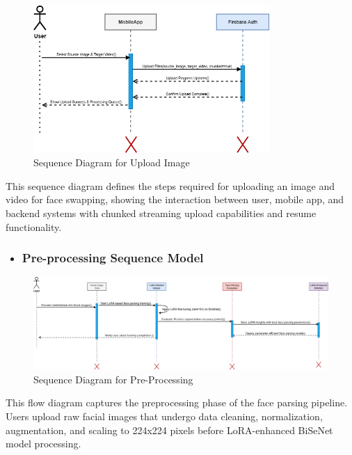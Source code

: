 \documentclass[12pt,a4paper]{report}
\begin{document}
\begin{figure}[H]
\centering
\includegraphics[width=0.8\textwidth]{figures/upload_image_sequence.png}
\caption{Sequence Diagram for Upload Image}
\label{fig:upload_sequence}
\end{figure}

This sequence diagram defines the steps required for uploading an image and video for face swapping, showing the interaction between user, mobile app, and backend systems with chunked streaming upload capabilities and resume functionality.

\begin{landscape}

\begin{itemize}
    \item \subsubsection{Pre-processing Sequence Model}
\end{itemize}
\begin{figure}[H]
\centering
\includegraphics[width=1.5\textwidth]{figures/pre.png}
\caption{Sequence Diagram for Pre-Processing}
\label{fig:preprocessing_sequence}
\end{figure}
\end{landscape}

This flow diagram captures the preprocessing phase of the face parsing pipeline. Users upload raw facial images that undergo data cleaning, normalization, augmentation, and scaling to 224x224 pixels before LoRA-enhanced BiSeNet model processing.
\end{document}
